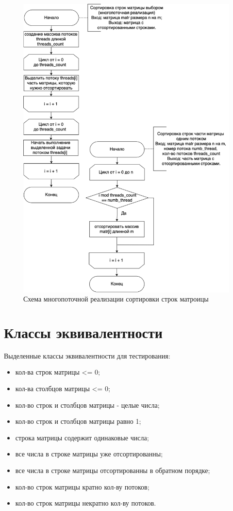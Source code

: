 \documentclass[a4paper,14pt, unknownkeysallowed]{extreport}
\begin{document}
\clearpage

\begin{figure}[h]
	\centering
	\includegraphics[scale=0.6]{img/select_sort_many_threads_scheme.png}
	\caption{Схема многопоточной реализации сортировки строк матроицы}
	\label{fig:select_sort_many_threads}
\end{figure} 

\clearpage

\section{Классы эквивалентности}

Выделенные классы эквивалентности для тестирования:

\begin{itemize}
	\item кол-ва строк матрицы <= 0;
	\item кол-ва столбцов матрицы <= 0;
	\item кол-во строк и столбцов матрицы - целые числа;
	\item кол-во строк и столбцов матрицы равно 1;
	\item строка матрицы содержит одинаковые числа;
	\item все числа в строке матрицы уже отсортированны;
	\item все числа в строке матрицы отсортированны в обратном порядке;
	\item кол-во строк матрицы кратно кол-ву потоков;
	\item кол-во строк матрицы некратно кол-ву потоков.
\end{itemize}
\end{document}
